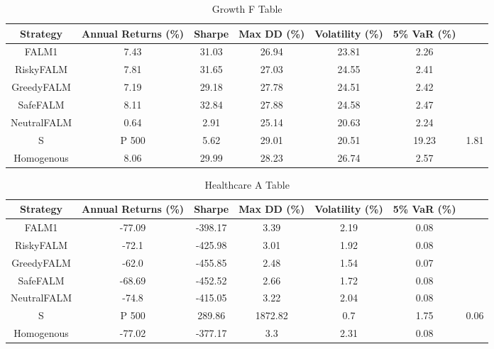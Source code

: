 \begin{table}[]
    \centering
    \caption{Growth F Table}
    \begin{tabular}{|c|c|c|c|c|c|c|}
        \hline
        Strategy & Annual Returns (\%) & Sharpe & Max \ac{DD} (\%) & Volatility (\%)& 5\% \ac{VaR} (\%) \\
        \hline
        FALM1 & 7.43 & 31.03 & 26.94 & 23.81 & 2.26 \\
        RiskyFALM & 7.81 & 31.65 & 27.03 & 24.55 & 2.41 \\
        GreedyFALM & 7.19 & 29.18 & 27.78 & 24.51 & 2.42 \\
        SafeFALM & 8.11 & 32.84 & 27.88 & 24.58 & 2.47 \\
        NeutralFALM & 0.64 & 2.91 & 25.14 & 20.63 & 2.24 \\
        S&P 500 & 5.62 & 29.01 & 20.51 & 19.23 & 1.81 \\
        Homogenous & 8.06 & 29.99 & 28.23 & 26.74 & 2.57 \\
        \hline
    \end{tabular}
    \label{tab:growth_f_table}
\end{table}

\begin{table}[]
    \centering
    \caption{Healthcare A Table}
    \begin{tabular}{|c|c|c|c|c|c|c|}
        \hline
        Strategy & Annual Returns (\%) & Sharpe & Max \ac{DD} (\%) & Volatility (\%)& 5\% \ac{VaR} (\%) \\
        \hline
        FALM1 & -77.09 & -398.17 & 3.39 & 2.19 & 0.08 \\
        RiskyFALM & -72.1 & -425.98 & 3.01 & 1.92 & 0.08 \\
        GreedyFALM & -62.0 & -455.85 & 2.48 & 1.54 & 0.07 \\
        SafeFALM & -68.69 & -452.52 & 2.66 & 1.72 & 0.08 \\
        NeutralFALM & -74.8 & -415.05 & 3.22 & 2.04 & 0.08 \\
        S&P 500 & 289.86 & 1872.82 & 0.7 & 1.75 & 0.06 \\
        Homogenous & -77.02 & -377.17 & 3.3 & 2.31 & 0.08 \\
        \hline
    \end{tabular}
    \label{tab:healthcare_a_table}
\end{table}

